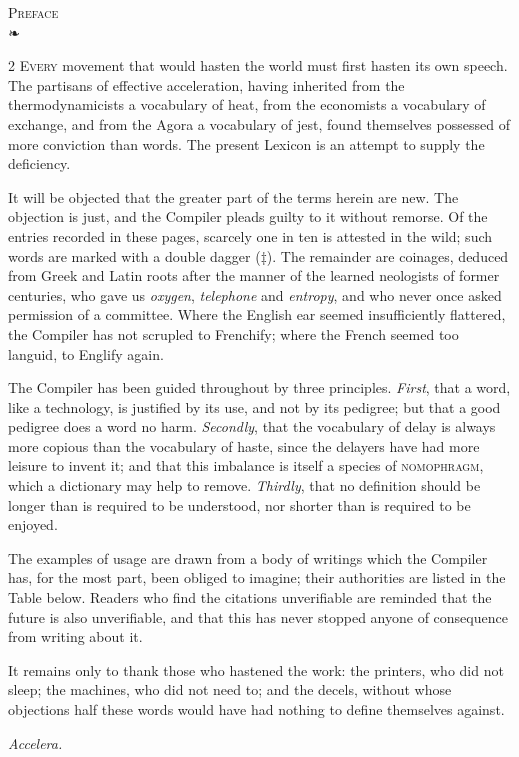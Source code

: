 \documentclass[10pt,twoside]{article}
\newcommand\xr[1]{\textsc{#1}}                   %
\begin{document}
\pagestyle{front}
\setcounter{page}{3}
\begin{center}
{\dispfont\Large\scshape Preface}\\[2pt]
{\color{rubric}❧}
\end{center}
\vspace{2mm}

\begin{multicols}{2}
\small
\lettrine{E}{very} movement that would hasten the world must first hasten its own speech. The partisans of effective acceleration, having inherited from the thermodynamicists a vocabulary of heat, from the economists a vocabulary of exchange, and from the Agora a vocabulary of jest, found themselves possessed of more conviction than words. The present Lexicon is an attempt to supply the deficiency.

It will be objected that the greater part of the terms herein are new. The objection is just, and the Compiler pleads guilty to it without remorse. Of the entries recorded in these pages, scarcely one in ten is attested in the wild; such words are marked with a double dagger (\textcolor{rubric}{‡}). The remainder are coinages, deduced from Greek and Latin roots after the manner of the learned neologists of former centuries, who gave us \textit{oxygen}, \textit{telephone} and \textit{entropy}, and who never once asked permission of a committee. Where the English ear seemed insufficiently flattered, the Compiler has not scrupled to Frenchify; where the French seemed too languid, to Englify again.

The Compiler has been guided throughout by three principles. \textit{First}, that a word, like a technology, is justified by its use, and not by its pedigree; but that a good pedigree does a word no harm. \textit{Secondly}, that the vocabulary of delay is always more copious than the vocabulary of haste, since the delayers have had more leisure to invent it; and that this imbalance is itself a species of \xr{nomophragm}, which a dictionary may help to remove. \textit{Thirdly}, that no definition should be longer than is required to be understood, nor shorter than is required to be enjoyed.

The examples of usage are drawn from a body of writings which the Compiler has, for the most part, been obliged to imagine; their authorities are listed in the Table below. Readers who find the citations unverifiable are reminded that the future is also unverifiable, and that this has never stopped anyone of consequence from writing about it.

It remains only to thank those who hastened the work: the printers, who did not sleep; the machines, who did not need to; and the decels, without whose objections half these words would have had nothing to define themselves against.

\hfill\textit{Accelera.}
\end{multicols}
\end{document}
